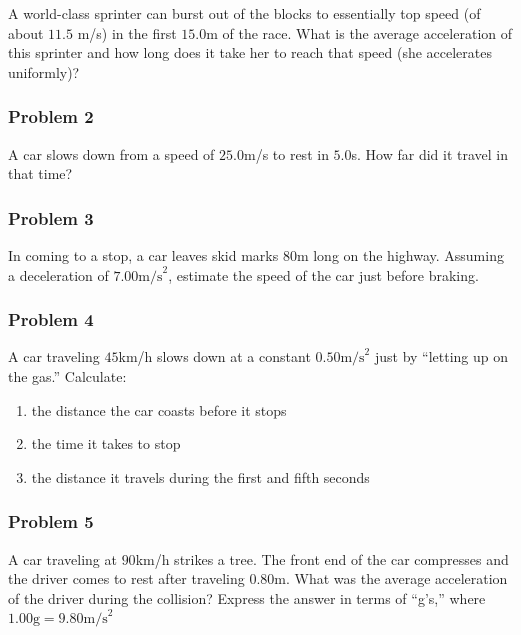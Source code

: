 \documentclass[
  letterpaper,
  DIV=11,
  numbers=noendperiod]{scrartcl}
\providecommand{\tightlist}{%
  \setlength{\itemsep}{0pt}\setlength{\parskip}{0pt}}\usepackage{longtable,booktabs,array}
\begin{document}
A world-class sprinter can burst out of the blocks to essentially top
speed (of about \(11.5\) m/s) in the first \(15.0\)m of the race. What
is the average acceleration of this sprinter and how long does it take
her to reach that speed (she accelerates uniformly)?

\hypertarget{problem-2-1}{%
\subsubsection{Problem 2}\label{problem-2-1}}

A car slows down from a speed of \(25.0\)m/s to rest in \(5.0\)s. How
far did it travel in that time?

\hypertarget{problem-3-1}{%
\subsubsection{Problem 3}\label{problem-3-1}}

In coming to a stop, a car leaves skid marks 80m long on the highway.
Assuming a deceleration of \(7.00 \text{m/s}^2\), estimate the speed of
the car just before braking.

\hypertarget{problem-4-1}{%
\subsubsection{Problem 4}\label{problem-4-1}}

A car traveling \(45\)km/h slows down at a constant
\(0.50 \text{m/s}^2\) just by ``letting up on the gas.'' Calculate:

\begin{enumerate}
\def\labelenumi{(\alph{enumi})}
\tightlist
\item
  the distance the car coasts before it stops
\item
  the time it takes to stop
\item
  the distance it travels during the first and fifth seconds
\end{enumerate}

\hypertarget{problem-5}{%
\subsubsection{Problem 5}\label{problem-5}}

A car traveling at \(90\)km/h strikes a tree. The front end of the car
compresses and the driver comes to rest after traveling \(0.80\)m. What
was the average acceleration of the driver during the collision? Express
the answer in terms of ``g's,'' where
\(1.00\text{g} = 9.80 \text{m/s}^2\)
\end{document}
